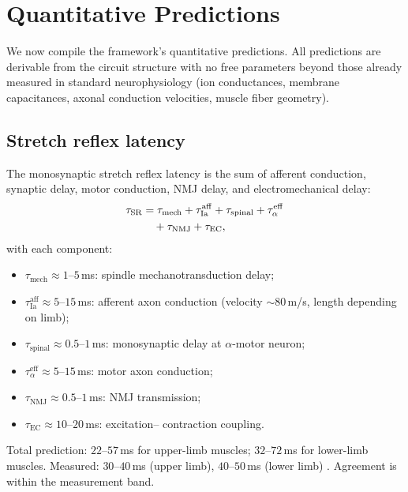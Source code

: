 \documentclass[11pt,twocolumn,a4paper]{article}
\theoremstyle{definition}
\theoremstyle{remark}
\begin{document}
\section{Quantitative Predictions}
\label{sec:predictions}

We now compile the framework's quantitative predictions. All
predictions are derivable from the circuit structure with no free
parameters beyond those already measured in standard neurophysiology
(ion conductances, membrane capacitances, axonal conduction
velocities, muscle fiber geometry).

\subsection{Stretch reflex latency}

The monosynaptic stretch reflex latency is the sum of afferent
conduction, synaptic delay, motor conduction, NMJ delay, and
electromechanical delay:
\begin{align}
\tau_{\mathrm{SR}} &= \tau_{\mathrm{mech}} + \tau_{\mathrm{Ia}}^{\mathrm{aff}}
+ \tau_{\mathrm{spinal}} + \tau_{\alpha}^{\mathrm{eff}} \notag\\
&\quad + \tau_{\mathrm{NMJ}} + \tau_{\mathrm{EC}},
\end{align}
with each component:
\begin{itemize}[leftmargin=*,itemsep=1pt]
\item $\tau_{\mathrm{mech}} \approx 1$--$5$\,ms: spindle
mechanotransduction delay;
\item $\tau_{\mathrm{Ia}}^{\mathrm{aff}} \approx 5$--$15$\,ms:
afferent axon conduction (velocity $\sim 80$\,m/s, length depending
on limb);
\item $\tau_{\mathrm{spinal}} \approx 0.5$--$1$\,ms: monosynaptic
delay at $\alpha$-motor neuron;
\item $\tau_{\alpha}^{\mathrm{eff}} \approx 5$--$15$\,ms: motor axon
conduction;
\item $\tau_{\mathrm{NMJ}} \approx 0.5$--$1$\,ms: NMJ transmission;
\item $\tau_{\mathrm{EC}} \approx 10$--$20$\,ms: excitation--%
contraction coupling.
\end{itemize}
Total prediction: $22$--$57$\,ms for upper-limb muscles;
$32$--$72$\,ms for lower-limb muscles. Measured: $30$--$40$\,ms
(upper limb), $40$--$50$\,ms (lower limb) \citep{matthews1990}.
Agreement is within the measurement band.
\end{document}
